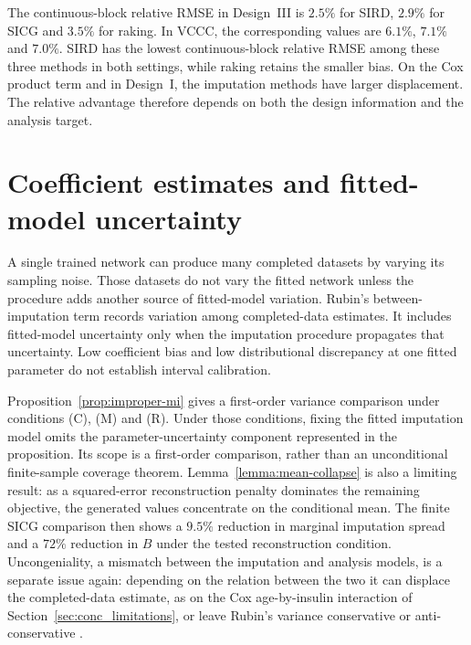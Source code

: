 The continuous-block relative RMSE in Design~III is $2.5\%$ for SIRD, $2.9\%$ for SICG and $3.5\%$ for raking. In VCCC, the corresponding values are $6.1\%$, $7.1\%$ and $7.0\%$. SIRD has the lowest continuous-block relative RMSE among these three methods in both settings, while raking retains the smaller bias. On the Cox product term and in Design~I, the imputation methods have larger displacement. The relative advantage therefore depends on both the design information and the analysis target.

\section{Coefficient estimates and fitted-model uncertainty}
\label{sec:conc_uncertainty}

A single trained network can produce many completed datasets by varying its sampling noise. Those datasets do not vary the fitted network unless the procedure adds another source of fitted-model variation. Rubin's between-imputation term records variation among completed-data estimates. It includes fitted-model uncertainty only when the imputation procedure propagates that uncertainty. Low coefficient bias and low distributional discrepancy at one fitted parameter do not establish interval calibration.

Proposition~\ref{prop:improper-mi} gives a first-order variance comparison under conditions (C), (M) and (R). Under those conditions, fixing the fitted imputation model omits the parameter-uncertainty component represented in the proposition. Its scope is a first-order comparison, rather than an unconditional finite-sample coverage theorem. Lemma~\ref{lemma:mean-collapse} is also a limiting result: as a squared-error reconstruction penalty dominates the remaining objective, the generated values concentrate on the conditional mean. The finite SICG comparison then shows a $9.5\%$ reduction in marginal imputation spread and a $72\%$ reduction in $B$ under the tested reconstruction condition. Uncongeniality, a mismatch between the imputation and analysis models, is a separate issue again: depending on the relation between the two it can displace the completed-data estimate, as on the Cox age-by-insulin interaction of Section~\ref{sec:conc_limitations}, or leave Rubin's variance conservative or anti-conservative \citep{meng1994multiple,robins2000inference}.

